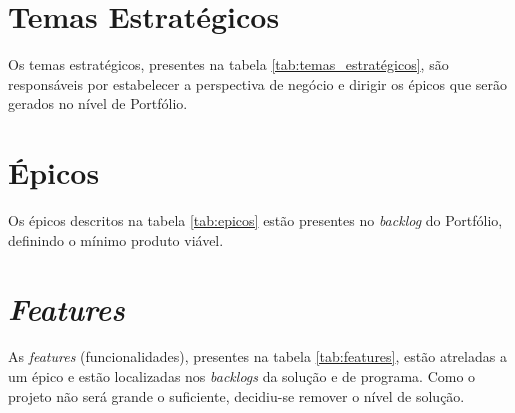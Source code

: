 \documentclass[
	12pt,				%
	oneside,			%
	a4paper,			%
	english,			%
	brazil,				%
	]{abntex2}
\begin{document}
\section{Temas Estratégicos}
Os temas estratégicos, presentes na tabela \ref{tab:temas_estratégicos}, são responsáveis por estabelecer a perspectiva de negócio e dirigir os épicos que serão gerados no nível de Portfólio.

\begin{table}[ht]
\end{table}

\section{Épicos}
Os épicos descritos na tabela \ref{tab:epicos} estão presentes no \foreignlanguage{english}{\textit{backlog}} do Portfólio, definindo o mínimo produto viável.

\begin{table}[ht]
\end{table}

\section{\textit{Features}}
As \foreignlanguage{english}{\textit{features}} (funcionalidades), presentes na tabela \ref{tab:features}, estão atreladas a um épico e estão localizadas nos \foreignlanguage{english}{\textit{backlogs}} da solução e de programa. Como o projeto não será grande o suficiente, decidiu-se remover o nível de solução.

\begin{table}[htb]
\end{table}
\end{document}

